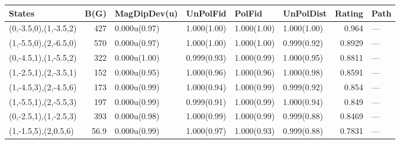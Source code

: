 \begin{tabular}{lrllllrl}
\hline
 States                &   B(G) & MagDipDev(u)   & UnPolFid    & PolFid      & UnPolDist   &   Rating & Path   \\
\hline
 (0,-3.5,0),(1,-3.5,2) &  427   & 0.000u(0.97)   & 1.000(1.00) & 1.000(1.00) & 1.000(1.00) &   0.964  & ---    \\
 (1,-5.5,0),(2,-6.5,0) &  570   & 0.000u(0.97)   & 1.000(1.00) & 1.000(1.00) & 0.999(0.92) &   0.8929 & ---    \\
 (0,-4.5,1),(1,-5.5,2) &  322   & 0.000u(1.00)   & 0.999(0.93) & 1.000(0.99) & 1.000(0.95) &   0.8811 & ---    \\
 (1,-2.5,1),(2,-3.5,1) &  152   & 0.000u(0.95)   & 1.000(0.96) & 1.000(0.96) & 1.000(0.98) &   0.8591 & ---    \\
 (1,-4.5,3),(2,-4.5,6) &  173   & 0.000u(0.99)   & 1.000(0.94) & 1.000(0.99) & 0.999(0.92) &   0.854  & ---    \\
 (1,-5.5,1),(2,-5.5,3) &  197   & 0.000u(0.99)   & 0.999(0.91) & 1.000(0.99) & 1.000(0.94) &   0.849  & ---    \\
 (0,-2.5,1),(1,-2.5,3) &  393   & 0.000u(0.98)   & 1.000(0.99) & 1.000(0.99) & 0.999(0.88) &   0.8469 & ---    \\
 (1,-1.5,5),(2,0.5,6)  &   56.9 & 0.000u(0.99)   & 1.000(0.97) & 1.000(0.93) & 0.999(0.88) &   0.7831 & ---    \\
\hline
\end{tabular}